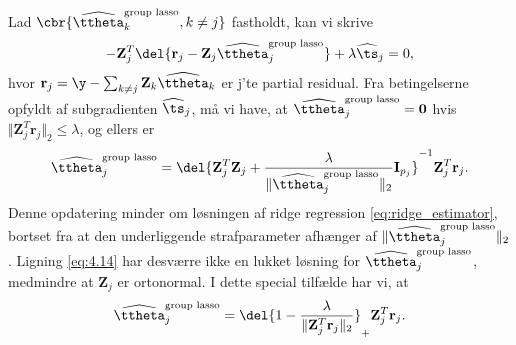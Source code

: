 Lad $\cbr{\widehat{\ttheta}^\text{group lasso}_k, k \neq j}$ fastholdt, kan vi skrive
\begin{align*}
- \mathbf{Z}_{j}^T \del{\mathbf{r}_j - \mathbf{Z}_j \widehat{\ttheta}^\text{group lasso}_j} + \lambda \widehat{\ts}_j = 0,
\end{align*}
hvor $\mathbf{r}_j = \y - \sum_{k \neq j} \mathbf{Z}_k \widehat{\ttheta}_k $ er j'te partial residual.
Fra betingelserne opfyldt af subgradienten $\widehat{\ts}_j$, må vi have, at $\widehat{\ttheta}^\text{group lasso}_j =\mathbf{0}$ hvis $\Vert \mathbf{Z}_j^T \mathbf{r}_j \Vert_2 \leq \lambda$, og ellers er
\begin{align}
\widehat{\ttheta}_j^\text{group lasso} = \del{\mathbf{Z}_j^T \mathbf{Z}_j + \frac{\lambda}{\Vert \widehat{\ttheta}^\text{group lasso}_j \Vert_2} \mathbf{I}_{p_j}}^{-1} \mathbf{Z}_j^T \mathbf{r}_j. \label{eq:4.14}
\end{align}
Denne opdatering minder om løsningen af ridge regression \eqref{eq:ridge_estimator}, bortset fra at den underliggende strafparameter afhænger af $\Vert \widehat{\ttheta}^\text{group lasso}_j \Vert_2$.
Ligning \eqref{eq:4.14} har desværre ikke en lukket løsning for $\widehat{\ttheta}^\text{group lasso}_j$, medmindre at $\mathbf{Z}_j$ er ortonormal. 
I dette special tilfælde har vi, at
\begin{align*}
\widehat{\ttheta}^\text{group lasso}_j = \del{1 - \frac{\lambda}{\Vert \mathbf{Z}_j^T \mathbf{r}_j \Vert_2}}_+  \mathbf{Z}_j^T \mathbf{r}_j.
\end{align*}

